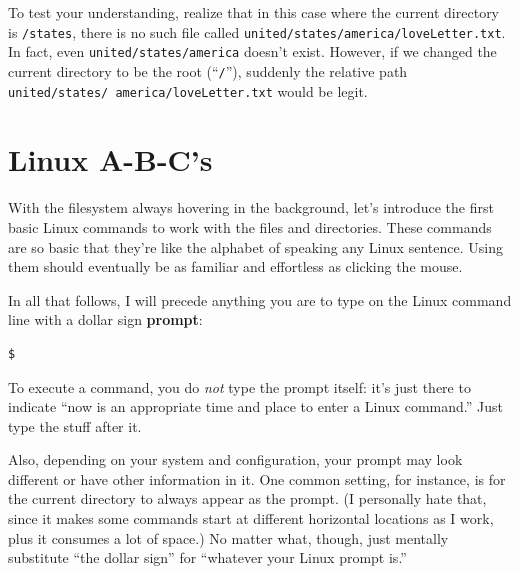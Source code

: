 To test your understanding, realize that in this case where the current
directory is \texttt{/states}, there is no such file called
\texttt{united/states/america/loveLetter.txt}. In fact, even 
\texttt{united/states/america} doesn't exist. However, if we changed the
current directory to be the root (``\texttt{/}''), suddenly the relative path
\texttt{united/states/ america/loveLetter.txt} would be legit.

\section{Linux A-B-C's}

With the filesystem always hovering in the background, let's introduce the
first basic Linux commands to work with the files and directories. These
commands are so basic that they're like the alphabet of speaking any Linux
sentence. Using them should eventually be as familiar and effortless as
clicking the mouse.

In all that follows, I will precede anything you are to type on the Linux
command line with a dollar sign \textbf{prompt}:

\begin{Verbatim}[fontsize=\small]
$
\end{Verbatim}

To execute a command, you do \textit{not} type the prompt itself: it's just
there to indicate ``now is an appropriate time and place to enter a Linux
command.'' Just type the stuff after it.

Also, depending on your system and configuration, your prompt may look
different or have other information in it. One common setting, for instance,
is for the current directory to always appear as the prompt. (I personally
hate that, since it makes some commands start at different horizontal
locations as I work, plus it consumes a lot of space.) No matter what, though,
just mentally substitute ``the dollar sign'' for ``whatever your Linux prompt
is.''

\newcommand{\bigline}{\begin{center} \line(1,0){300} \end{center}}


